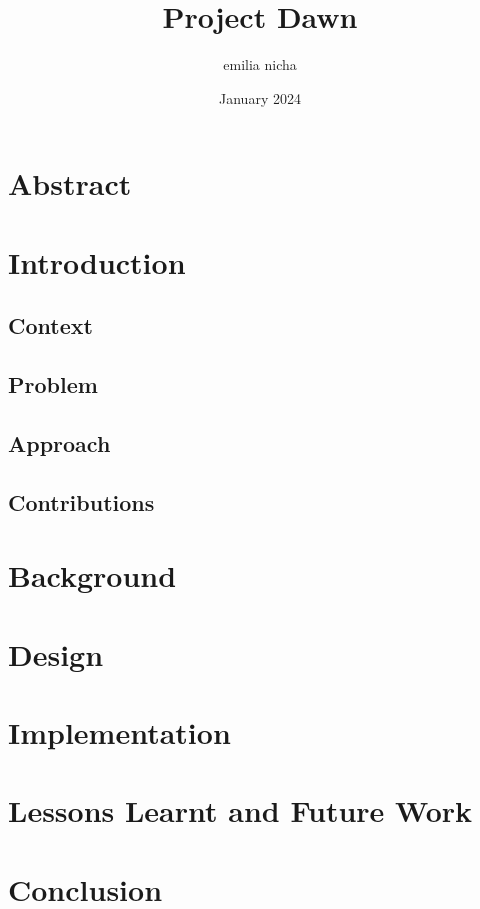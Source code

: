\documentclass{article}
\title{Project Dawn}
\author{emilia nicha }
\date{January 2024}
\begin{document}
\maketitle

\section*{Abstract}
\section{Introduction}
\subsection{Context}
\subsection{Problem}
\subsection{Approach}
\subsection{Contributions}
\section{Background}
\section{Design}    
\section{Implementation}    
\section{Lessons Learnt and Future Work}    
\section{Conclusion}
\end{document}
